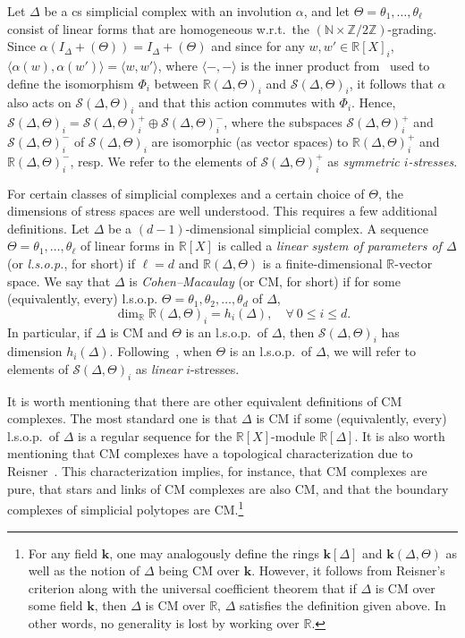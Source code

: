 \documentclass[ALCO,ThmDefs,Unicode,epreuves]{cedram}
\newcommand{\field}{\mathbf{k}}
\newcommand{\N}{\mathbb{N}}
\newcommand{\R}{\mathbb{R}{}}
\newcommand{\Z}{{\mathbb Z}}
\newcommand{\Stress}{\mathcal{S}}
\begin{document}
Let $\Delta$ be a cs simplicial complex with an involution $\alpha$, and let $\Theta=\theta_1,\ldots,\theta_\ell$ consist of linear forms that are homogeneous w.r.t.~the $(\N\times \Z/2\Z)$-grading. Since $\alpha(I_\Delta+(\Theta))=I_\Delta+(\Theta)$ and since for any $w,w'\in \R[X]_i$, $\langle\alpha(w),\alpha(w')\rangle=\langle w,w'\rangle$, where $\langle-,-\rangle$ is the inner product from~\cite[Section 3]{Lee96} used to define the isomorphism $\Phi_i$ between $\R(\Delta, \Theta)_i$ and $\Stress(\Delta, \Theta)_i$, it follows that $\alpha$ also acts on $\Stress(\Delta, \Theta)_i$ and that this action commutes with $\Phi_i$. Hence, $\Stress(\Delta, \Theta)_i=\Stress(\Delta, \Theta)_i^+ \oplus \Stress(\Delta, \Theta)_i^-$, where the subspaces $\Stress(\Delta, \Theta)^+_i$ and $\Stress(\Delta, \Theta)^-_i$ of $\Stress(\Delta,\Theta)_i$ are isomorphic (as vector spaces) to $\R(\Delta, \Theta)^+_i$ and $\R(\Delta, \Theta)^-_i$, resp. We refer to the elements of $\Stress(\Delta, \Theta)^+_i$ as \emph{symmetric $i$-stresses}. 

For certain classes of simplicial complexes and a certain choice of $\Theta$, the dimensions of stress spaces are well understood. This requires a few additional definitions. 
Let $\Delta$ be a $(d-1)$-dimensional simplicial complex. A sequence $\Theta=\theta_1,\ldots,\theta_\ell$ of linear forms in $\R[X]$ is called a \emph{linear system of parameters of $\Delta$} (or \emph{l.s.o.p.}, for short) if $\ell=d$ and $\R(\Delta,\Theta)$ is a finite-dimensional $\R$-vector space. We say that $\Delta$ is \emph{Cohen--Macaulay} (or CM, for short) if for some (equivalently, every) l.s.o.p. $\Theta=\theta_1, \theta_2, \dots, \theta_d$ of $\Delta$, $$\dim_\R \R(\Delta,\Theta)_i=h_i(\Delta), \quad \forall \ 0\leq i\leq d.$$ In particular, if $\Delta$ is CM and $\Theta$ is an l.s.o.p.~of $\Delta$, then $\Stress(\Delta, \Theta)_i$ has dimension $h_i(\Delta)$. Following~\cite{Lee96}, when $\Theta$ is an l.s.o.p.~of $\Delta$, we will refer to elements of $\Stress(\Delta, \Theta)_i$ as \emph{linear} $i$-stresses.

It is worth mentioning that there are other equivalent definitions of CM complexes. The most standard one is that $\Delta$ is CM if some (equivalently, every) l.s.o.p.~of $\Delta$ is a regular sequence for the $\R[X]$-module $\R[\Delta]$. It is also worth mentioning that CM complexes have a topological characterization due to Reisner~\cite{Reisner}. This characterization implies, for instance, that CM complexes are pure, that stars and links of CM complexes are also CM, and that the boundary complexes of simplicial polytopes are CM.\footnote{For any field $\field$, one may analogously define the rings $\field[\Delta]$ and $\field(\Delta,\Theta)$ as well as the notion of $\Delta$ being CM over $\field$. However, it follows from Reisner's criterion along with the universal coefficient theorem that if $\Delta$ is CM over some field $\field$, then $\Delta$ is CM over $\R$, \ie $\Delta$ satisfies the definition given above. In other words, no generality is lost by working over $\R$.}
\end{document}
